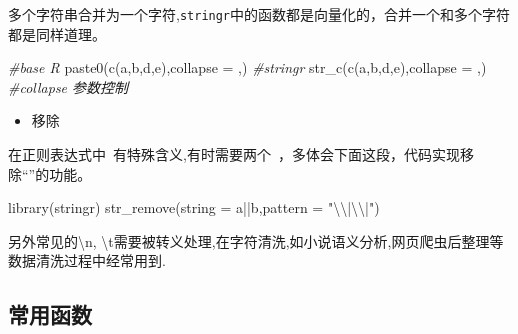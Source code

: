 \documentclass[
]{book}
\newenvironment{Shaded}{\begin{snugshade}}{\end{snugshade}}
\newcommand{\AttributeTok}[1]{\textcolor[rgb]{0.77,0.63,0.00}{#1}}
\newcommand{\CommentTok}[1]{\textcolor[rgb]{0.56,0.35,0.01}{\textit{#1}}}
\newcommand{\FunctionTok}[1]{\textcolor[rgb]{0.00,0.00,0.00}{#1}}
\newcommand{\NormalTok}[1]{#1}
\newcommand{\SpecialCharTok}[1]{\textcolor[rgb]{0.00,0.00,0.00}{#1}}
\newcommand{\StringTok}[1]{\textcolor[rgb]{0.31,0.60,0.02}{#1}}
\providecommand{\tightlist}{%
  \setlength{\itemsep}{0pt}\setlength{\parskip}{0pt}}
\begin{document}
多个字符串合并为一个字符,\texttt{stringr}中的函数都是向量化的，合并一个和多个字符都是同样道理。

\begin{Shaded}
\begin{Highlighting}[]
\CommentTok{\#base R}
\FunctionTok{paste0}\NormalTok{(}\FunctionTok{c}\NormalTok{(}\StringTok{\textquotesingle{}a\textquotesingle{}}\NormalTok{,}\StringTok{\textquotesingle{}b\textquotesingle{}}\NormalTok{,}\StringTok{\textquotesingle{}d\textquotesingle{}}\NormalTok{,}\StringTok{\textquotesingle{}e\textquotesingle{}}\NormalTok{),}\AttributeTok{collapse =} \StringTok{\textquotesingle{},\textquotesingle{}}\NormalTok{)}
\CommentTok{\#stringr}
\FunctionTok{str\_c}\NormalTok{(}\FunctionTok{c}\NormalTok{(}\StringTok{\textquotesingle{}a\textquotesingle{}}\NormalTok{,}\StringTok{\textquotesingle{}b\textquotesingle{}}\NormalTok{,}\StringTok{\textquotesingle{}d\textquotesingle{}}\NormalTok{,}\StringTok{\textquotesingle{}e\textquotesingle{}}\NormalTok{),}\AttributeTok{collapse =} \StringTok{\textquotesingle{},\textquotesingle{}}\NormalTok{)  }\CommentTok{\#collapse 参数控制}
\end{Highlighting}
\end{Shaded}

\begin{itemize}
\tightlist
\item
  移除
\end{itemize}

在正则表达式中~有特殊含义,有时需要两个~，多体会下面这段，代码实现移除``\textbar\textbar{}''的功能。

\begin{Shaded}
\begin{Highlighting}[]
\FunctionTok{library}\NormalTok{(stringr)}
\FunctionTok{str\_remove}\NormalTok{(}\AttributeTok{string =} \StringTok{\textquotesingle{}a||b\textquotesingle{}}\NormalTok{,}\AttributeTok{pattern =} \StringTok{"}\SpecialCharTok{\textbackslash{}\textbackslash{}}\StringTok{|}\SpecialCharTok{\textbackslash{}\textbackslash{}}\StringTok{|"}\NormalTok{)}
\end{Highlighting}
\end{Shaded}

另外常见的\textbackslash n, \textbackslash t需要被转义处理,在字符清洗,如小说语义分析,网页爬虫后整理等数据清洗过程中经常用到.

\hypertarget{ux5e38ux7528ux51fdux6570-2}{%
\subsection{常用函数}\label{ux5e38ux7528ux51fdux6570-2}}
\end{document}
